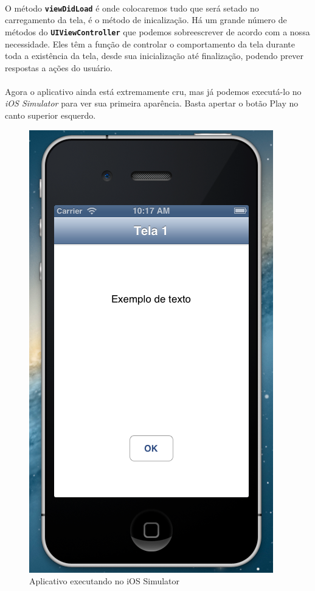 \documentclass[a4paper,12pt,brazil,doubleside]{book}
\begin{document}
\paragraph{}O método \texttt{\textbf{viewDidLoad}} é onde colocaremos tudo que será setado no carregamento da tela, é o método de inicalização. Há um grande número de métodos do \texttt{\textbf{UIViewController}} que podemos sobreescrever de acordo com a nossa necessidade. Eles têm a função de controlar o comportamento da tela durante toda a existência da tela, desde sua inicialização até finalização, podendo prever respostas a ações do usuário.
\paragraph{}Agora o aplicativo ainda está extremamente cru, mas já podemos executá-lo no \emph{iOS Simulator} para ver sua primeira aparência. Basta apertar o botão Play no canto superior esquerdo.

\begin{figure}[h]
  \centering
  \includegraphics[totalheight=0.4\textheight]{../figuras/ios/1/simulador1_tela1.png}
  \caption{Aplicativo executando no iOS Simulator}
  \label{fig:a}
\end{figure}
\end{document}
